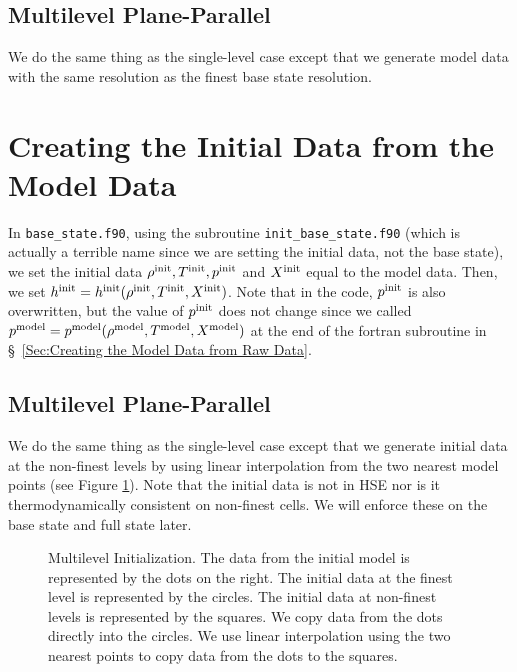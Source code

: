 \documentclass[11pt]{article}
\def\init  {\rm init}
\def\model {\rm model}
\begin{document}
\subsection{Multilevel Plane-Parallel}
We do the same thing as the single-level case except that we generate model data with the same resolution as the finest base state resolution.
\section{Creating the Initial Data from the Model Data}
In {\tt base\_state.f90}, using the subroutine {\tt init\_base\_state.f90} (which is actually a terrible name since we are setting the initial data, not the base state), we set the initial data $\rho^{\init}, T^{\init}, p^{\init}$ and $X^{\init}$ equal to the model data.  Then, we set $h^{\init} = h^{\init}(\rho^{\init},T^{\init},X^{\init})$.  Note that in the code, $p^{\init}$ is also overwritten, but the value of $p^{\init}$ does not change since we called $p^{\model} = p^{\model}(\rho^{\model},T^{\model},X^{\model})$ at the end of the fortran subroutine in \S~\ref{Sec:Creating the Model Data from Raw Data}.
\subsection{Multilevel Plane-Parallel}
We do the same thing as the single-level case except that we generate initial data at the non-finest levels by using linear interpolation from the two nearest model points (see Figure \ref{Fig:Multilevel Initialization}).  Note that the initial data is not in HSE nor is it thermodynamically consistent on non-finest cells.  We will enforce these on the base state and full state later.
\begin{figure}[tpb]
\begin{center}
\caption{Multilevel Initialization.  The data from the initial model is represented by the dots on the right.  The initial data at the finest level is represented by the circles.  The initial data at non-finest levels is represented by the squares.  We copy data from the dots directly into the circles.  We use linear interpolation using the two nearest points to copy data from the dots to the squares.}
\label{Fig:Multilevel Initialization}
\end{center}
\end{figure}
\end{document}
